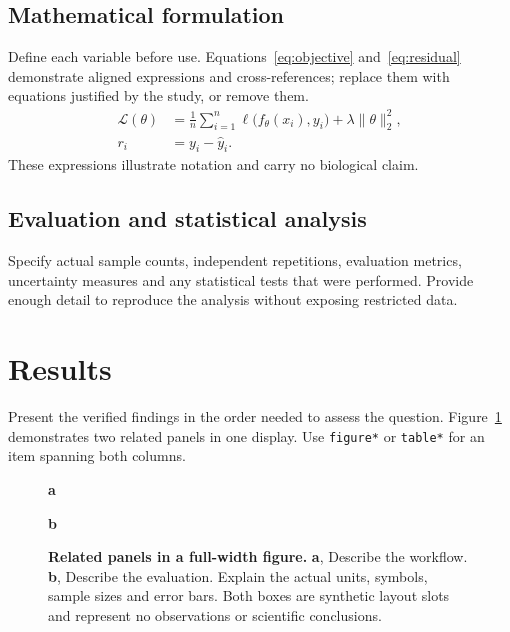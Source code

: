 \documentclass[unnumsec,webpdf,contemporary,large]{oup-authoring-template}
\begin{document}
\subsection{Mathematical formulation}
Define each variable before use. Equations~\eqref{eq:objective}
and~\eqref{eq:residual} demonstrate aligned expressions and cross-references;
replace them with equations justified by the study, or remove them.
\begin{align}
 \mathcal{L}(\theta)&=\frac{1}{n}\sum_{i=1}^{n}
  \ell\bigl(f_\theta(x_i),y_i\bigr)
  +\lambda\lVert\theta\rVert_2^2,\label{eq:objective}\\
 r_i&=y_i-\widehat y_i.\label{eq:residual}
\end{align}
These expressions illustrate notation and carry no biological claim.

\subsection{Evaluation and statistical analysis}
Specify actual sample counts, independent repetitions, evaluation metrics,
uncertainty measures and any statistical tests that were performed. Provide
enough detail to reproduce the analysis without exposing restricted data.

\section{Results}\label{sec:results}
Present the verified findings in the order needed to assess the question.
Figure~\ref{fig:comparison} demonstrates two related panels in one display.
Use \texttt{figure*} or \texttt{table*} for an item spanning both columns.

\begin{figure}[t]
\centering
\begin{minipage}[t]{0.47\textwidth}
\raggedright\textbf{a}\par\smallskip
{}
\end{minipage}\hfill
\begin{minipage}[t]{0.47\textwidth}
\raggedright\textbf{b}\par\smallskip
{}
\end{minipage}
\caption{\textbf{Related panels in a full-width figure.} \textbf{a}, Describe
the workflow. \textbf{b}, Describe the evaluation. Explain the actual units,
symbols, sample sizes and error bars. Both boxes are synthetic layout slots
and represent no observations or scientific conclusions.}
\label{fig:comparison}
\end{figure}
\end{document}
